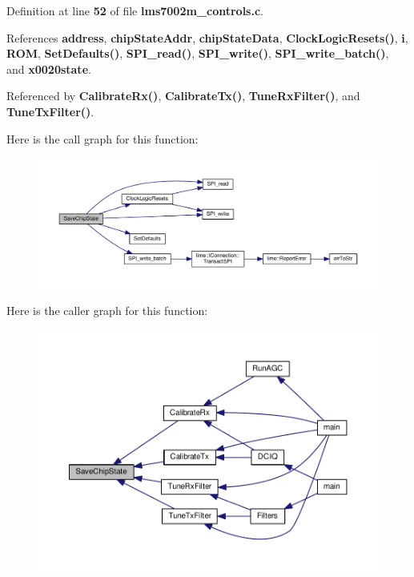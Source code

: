 Definition at line {\bf 52} of file {\bf lms7002m\+\_\+controls.\+c}.



References {\bf address}, {\bf chip\+State\+Addr}, {\bf chip\+State\+Data}, {\bf Clock\+Logic\+Resets()}, {\bf i}, {\bf R\+OM}, {\bf Set\+Defaults()}, {\bf S\+P\+I\+\_\+read()}, {\bf S\+P\+I\+\_\+write()}, {\bf S\+P\+I\+\_\+write\+\_\+batch()}, and {\bf x0020state}.



Referenced by {\bf Calibrate\+Rx()}, {\bf Calibrate\+Tx()}, {\bf Tune\+Rx\+Filter()}, and {\bf Tune\+Tx\+Filter()}.



Here is the call graph for this function\+:
\nopagebreak
\begin{figure}[H]
\begin{center}
\leavevmode
\includegraphics[width=350pt]{d7/db8/lms7002m__controls_8c_a1ed7dc939bfc16c3178b901647de0640_cgraph}
\end{center}
\end{figure}




Here is the caller graph for this function\+:
\nopagebreak
\begin{figure}[H]
\begin{center}
\leavevmode
\includegraphics[width=350pt]{d7/db8/lms7002m__controls_8c_a1ed7dc939bfc16c3178b901647de0640_icgraph}
\end{center}
\end{figure}


